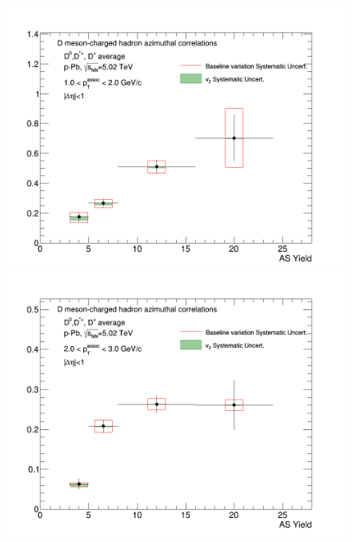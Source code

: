 \begin{figure}[!htbp]
{\includegraphics[width=0.49\linewidth, height=0.33\linewidth]{figures/FitOutput/CanvasFinalTrendASYield_pthad1dotto2dot.png}}
{\includegraphics[width=0.49\linewidth, height=0.33\linewidth]{figures/FitOutput/CanvasFinalTrendASYield_pthad2dotto3dot.png}}
\end{figure}
